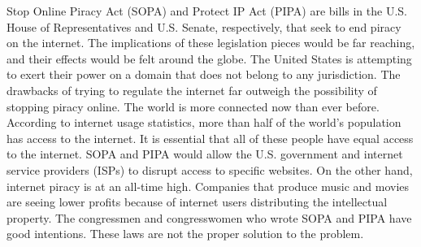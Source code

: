 \documentclass[11pt,journal,compsoc]{IEEEtran}
\begin{document}
\IEEEdisplaynontitleabstractindextext

\IEEEpeerreviewmaketitle




 Stop Online Piracy Act (SOPA) and Protect IP Act (PIPA) are bills in the U.S. House of Representatives and U.S. Senate, respectively, that seek to end piracy on the internet. The implications of these legislation pieces would be far reaching, and their effects would be felt around the globe. The United States is attempting to exert their power on a domain that does not belong to any jurisdiction. The drawbacks of trying to regulate the internet far outweigh the possibility of stopping piracy online. The world is more connected now than ever before. According to internet usage statistics, more than half of the world's population has access to the internet. It is essential that all of these people have equal access to the internet. SOPA and PIPA would allow the U.S. government and internet service providers (ISPs) to disrupt access to specific websites. On the other hand, internet piracy is at an all-time high. Companies that produce music and movies are seeing lower profits because of internet users distributing the intellectual property. The congressmen and congresswomen who wrote SOPA and PIPA have good intentions. These laws are not the proper solution to the problem.
\end{document}
